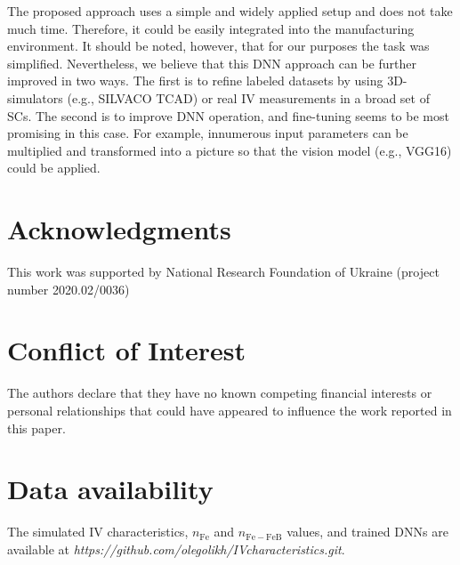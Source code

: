 \documentclass[num-refs]{wiley-article} %
\begin{document}
The proposed approach uses a simple and widely applied setup and does not take much time.
Therefore, it could be easily integrated into the manufacturing environment.
It should be noted, however, that for our purposes the task was  simplified.
Nevertheless, we believe that this DNN approach can be further improved in two ways.
The first is to refine labeled datasets by using 3D-simulators (e.g., SILVACO TCAD) or real IV measurements in a broad set of SCs.
The second is to improve DNN operation, and fine-tuning seems to be most promising in this case.
For example,
innumerous input parameters can be multiplied and transformed into a picture
so that the vision model (e.g., VGG16) could be applied.



\section*{Acknowledgments}
This work was supported by National Research Foundation  of Ukraine
(project number 2020.02/0036)

\section*{Conflict of Interest}
The authors declare that they have no known competing financial interests or
personal relationships that could have appeared to influence the work reported
in this paper.

\section*{Data availability}

The simulated IV characteristics, $n_\mathrm{Fe}$ and $n_\mathrm{Fe-FeB}$ values,
and trained DNNs are available
at \newline
\emph{https://github.com/olegolikh/IVcharacteristics.git}.

\end{document}
